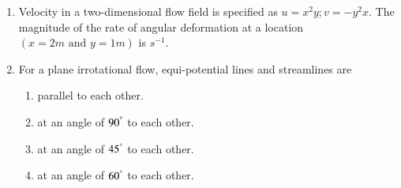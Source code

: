 \documentclass[journal]{IEEEtran}
\begin{document}
\begin{enumerate}
    \item Velocity in a two-dimensional flow field is specified as $u=x^2y;v=-y^2x$. The magnitude of the rate of angular deformation at a location $(x=2m \text{ and } y=1m)$ is \underline{\hspace{1cm}}$s^{-1}$.

    \item For a plane irrotational flow, equi-potential lines and streamlines are
        \begin{enumerate}
            \item parallel to each other.
            \item at an angle of $90^\degree$ to each other.
            \item at an angle of $45^\degree$ to each other.
            \item at an angle of $60^\degree$ to each other.
        \end{enumerate}

    \end{enumerate}
\end{document}
